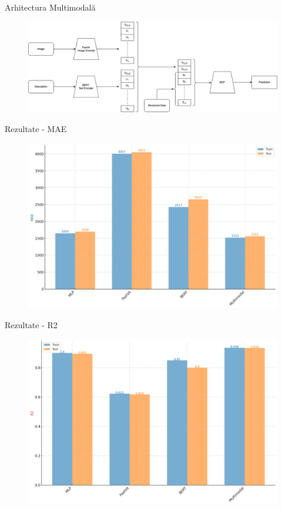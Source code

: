\documentclass[aspectratio=169]{beamer}
\begin{document}
\begin{frame}{Arhitectura Multimodală}
    \begin{figure}[ht]
    \centering
    \includegraphics[width=\linewidth]{images/architecture.png}
    \end{figure}
\end{frame}

\begin{frame}{Rezultate - MAE}
    \begin{figure}
        \centering
        \includegraphics[width=0.8\linewidth]{images/mae.png}
    \end{figure}
\end{frame}

\begin{frame}{Rezultate - R2}
    \begin{figure}
        \centering
        \includegraphics[width=0.8\linewidth]{images/r2.png}
    \end{figure}
\end{frame} 
\end{document}
